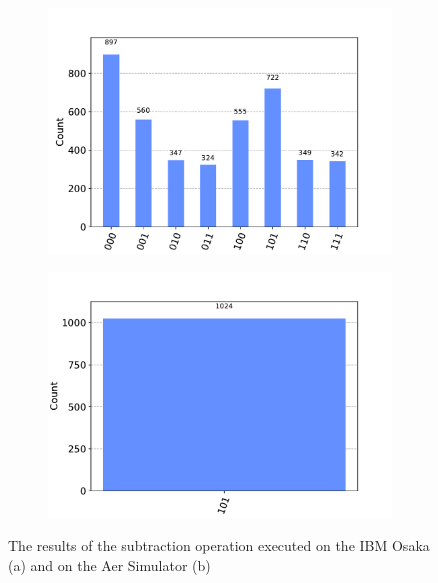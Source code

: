\begin{figure}[ht]
    \centering
    \begin{subfigure}{0.5\textwidth}
        \centering
        \includegraphics[scale=0.4]{images/6_Complete_System/adder_subtractor_ibmq_result.pdf}
        \caption{}
    \end{subfigure}
    \begin{subfigure}{0.5\textwidth}
        \centering
        \includegraphics[scale=0.4]{images/6_Complete_System/adder_subtractor_aer_result.pdf}
        \caption{}
    \end{subfigure}
    \caption{The results  of the subtraction operation executed on the IBM Osaka (a) and on the Aer Simulator (b)}
\end{figure}

